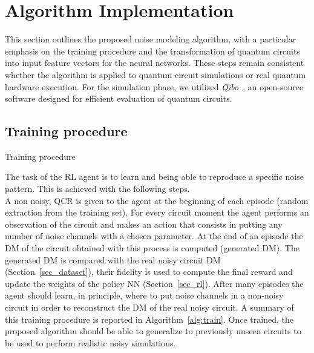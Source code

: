 \documentclass[referee,sn-basic]{sn-jnl} %
\begin{document}
\section{Algorithm Implementation}\label{sec_methodology}
This section outlines the proposed noise modeling algorithm, 
with a particular emphasis on the training procedure 
and the transformation of quantum circuits into input feature vectors for the neural networks. 
These steps remain consistent whether the algorithm is applied to quantum circuit simulations or real quantum hardware execution. 
For the simulation phase, we utilized \textit{Qibo}~\cite{Efthymiou_2021}, 
an open-source software designed for efficient evaluation of quantum circuits.

\subsection{Training procedure}\label{sec_training}

\begin{algorithm*}
\caption{Training procedure}\label{alg:train}
\begin{algorithmic}
    \EndFor
\EndFor
\end{algorithmic}
\end{algorithm*}

The task of the RL agent is to learn and being able to reproduce a specific noise pattern. This is achieved with the following steps.\\
A non noisy, QCR is given to the agent at the beginning of each episode (random extraction from the training set). For every circuit moment the agent performs an observation of the circuit and makes an action that consists in putting any number of noise channels with a chosen parameter. At the end of an episode the DM of the circuit obtained with this process is computed (generated DM). The generated DM is compared with the real noisy circuit DM (Section~\ref{sec_dataset}), their fidelity is used to compute the final reward and update the weights of the policy NN (Section~\ref{sec_rl}).
After many episodes the agent should learn, in principle, where to put noise channels in a non-noisy circuit in order to reconstruct the DM of the real noisy circuit. 
A summary of this training procedure is reported in Algorithm~\ref{alg:train}. Once trained, the proposed algorithm should be able to generalize to previously unseen circuits to be used to perform realistic noisy simulations.\\
\end{document}
